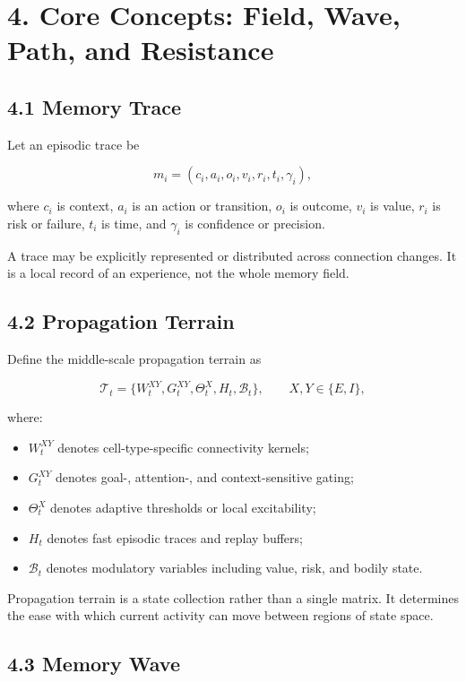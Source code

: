 \documentclass[11pt, a4paper]{article}
\begin{document}
\section{4. Core Concepts: Field, Wave, Path, and Resistance}

\subsection{4.1 Memory Trace}

Let an episodic trace be

\[
m_i=(c_i,a_i,o_i,v_i,r_i,t_i,\gamma_i),
\]

where $c_i$ is context, $a_i$ is an action or transition, $o_i$ is outcome, $v_i$ is value, $r_i$ is risk or failure, $t_i$ is time, and $\gamma_i$ is confidence or precision.

A trace may be explicitly represented or distributed across connection changes. It is a local record of an experience, not the whole memory field.

\subsection{4.2 Propagation Terrain}

Define the middle-scale propagation terrain as

\[
\mathcal{T}_t=\{W_t^{XY},G_t^{XY},\Theta_t^X,H_t,\mathcal{B}_t\},\qquad X,Y\in\{E,I\},
\]

where:

\begin{itemize}
\item $W_t^{XY}$ denotes cell-type-specific connectivity kernels;
\item $G_t^{XY}$ denotes goal-, attention-, and context-sensitive gating;
\item $\Theta_t^X$ denotes adaptive thresholds or local excitability;
\item $H_t$ denotes fast episodic traces and replay buffers;
\item $\mathcal{B}_t$ denotes modulatory variables including value, risk, and bodily state.

\end{itemize}
Propagation terrain is a state collection rather than a single matrix. It determines the ease with which current activity can move between regions of state space.

\subsection{4.3 Memory Wave}
\end{document}
